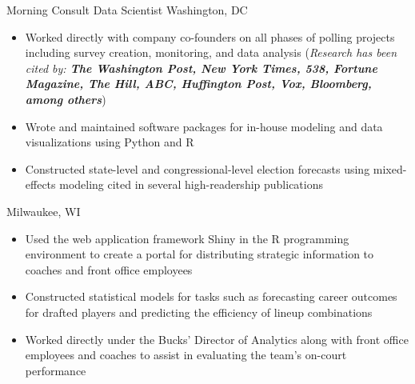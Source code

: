 \documentclass[11pt,a4paper,sans]{moderncv}        %
\begin{document}
  {Morning Consult Data Scientist}
  {}
  {Washington, DC}
  {}
  {
    \begin{itemize}
		\item{Worked directly with company co-founders on all phases of polling projects including survey creation, monitoring, and data analysis (\textit{Research has been cited by: \textbf{The Washington Post, New York Times, 538, Fortune Magazine, The Hill, ABC, Huffington Post, Vox, Bloomberg, among others}})}
 		\item{Wrote and maintained software packages for in-house modeling and data visualizations using Python and R}
		\item{Constructed state-level and congressional-level election forecasts using mixed-effects modeling cited in several high-readership publications}
    \end{itemize}
  }

  {}
  {Milwaukee, WI}
  {}
  {
    \begin{itemize}
      \item{Used the web application framework Shiny in the R programming environment to create a portal for distributing strategic information to coaches and front office employees}
      \item{Constructed statistical models for tasks such as forecasting career outcomes for drafted players and predicting the efficiency of lineup combinations}
      \item{Worked directly under the Bucks' Director of Analytics along with front office employees and coaches to assist in evaluating the team's on-court performance}
    \end{itemize}
  }

\clearpage
\end{document}
